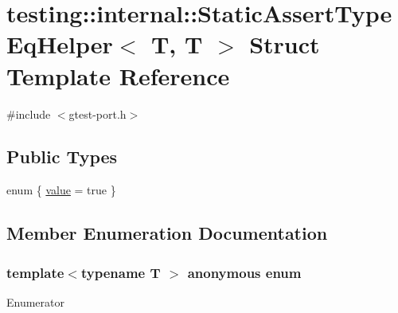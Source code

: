 \hypertarget{structtesting_1_1internal_1_1StaticAssertTypeEqHelper_3_01T_00_01T_01_4}{}\section{testing\+:\+:internal\+:\+:Static\+Assert\+Type\+Eq\+Helper$<$ T, T $>$ Struct Template Reference}
\label{structtesting_1_1internal_1_1StaticAssertTypeEqHelper_3_01T_00_01T_01_4}


{\ttfamily \#include $<$gtest-\/port.\+h$>$}

\subsection*{Public Types}
\begin{DoxyCompactItemize}
\item 
enum \{ \hyperlink{structtesting_1_1internal_1_1StaticAssertTypeEqHelper_3_01T_00_01T_01_4_acdb69a9c4164628ea6a80bd6442058c6a63c475f543e4e977d43c5093dd2b7f3f}{value} = true
 \}
\end{DoxyCompactItemize}


\subsection{Member Enumeration Documentation}
\subsubsection[{\texorpdfstring{anonymous enum}{anonymous enum}}]{\setlength{\rightskip}{0pt plus 5cm}template$<$typename T $>$ anonymous enum}\hypertarget{structtesting_1_1internal_1_1StaticAssertTypeEqHelper_3_01T_00_01T_01_4_acdb69a9c4164628ea6a80bd6442058c6}{}\label{structtesting_1_1internal_1_1StaticAssertTypeEqHelper_3_01T_00_01T_01_4_acdb69a9c4164628ea6a80bd6442058c6}
\begin{Desc}
\item[Enumerator]\par
\begin{description}
\item[{\em 
value\hypertarget{structtesting_1_1internal_1_1StaticAssertTypeEqHelper_3_01T_00_01T_01_4_acdb69a9c4164628ea6a80bd6442058c6a63c475f543e4e977d43c5093dd2b7f3f}{}\label{structtesting_1_1internal_1_1StaticAssertTypeEqHelper_3_01T_00_01T_01_4_acdb69a9c4164628ea6a80bd6442058c6a63c475f543e4e977d43c5093dd2b7f3f}
}]\end{description}
\end{Desc}

